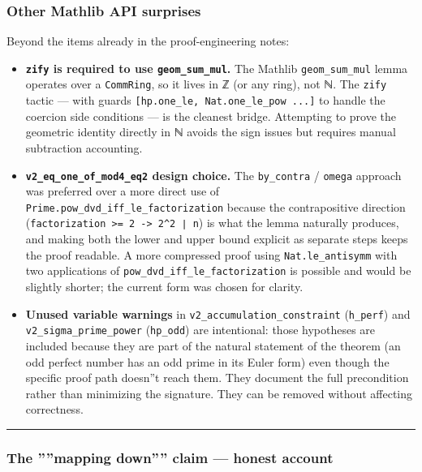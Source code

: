 \documentclass[10pt,a4paper]{article}
\begin{document}
\subsubsection{Other Mathlib API surprises}

Beyond the items already in the proof-engineering notes:

\begin{itemize}
    \item \textbf{\texttt{zify} is required to use \texttt{geom\_sum\_mul}.} The Mathlib \texttt{geom\_sum\_mul} lemma operates
over a \texttt{CommRing}, so it lives in ℤ (or any ring), not ℕ. The \texttt{zify} tactic --- with guards
\texttt{{[}hp.one\_le, Nat.one\_le\_pow ...{]}} to handle the coercion side conditions --- is the cleanest
bridge. Attempting to prove the geometric identity directly in ℕ avoids the sign issues but
requires manual subtraction accounting.
    \item \textbf{\texttt{v2\_eq\_one\_of\_mod4\_eq2} design choice.} The \texttt{by\_contra} / \texttt{omega} approach was preferred
over a more direct use of \texttt{Prime.pow\_dvd\_iff\_le\_factorization} because the contrapositive
direction (\texttt{factorization \textgreater{}= 2 -\textgreater{} 2\^{}2 ∣ n}) is what the lemma naturally produces, and making
both the lower and upper bound explicit as separate steps keeps the proof readable. A more
compressed proof using \texttt{Nat.le\_antisymm} with two applications of
\texttt{pow\_dvd\_iff\_le\_factorization} is possible and would be slightly shorter; the current form
was chosen for clarity.
    \item \textbf{Unused variable warnings} in \texttt{v2\_accumulation\_constraint} (\texttt{h\_perf}) and
\texttt{v2\_sigma\_prime\_power} (\texttt{hp\_odd}) are intentional: those hypotheses are included because
they are part of the natural statement of the theorem (an odd perfect number has an odd prime
in its Euler form) even though the specific proof path doesn''t reach them. They document
the full precondition rather than minimizing the signature. They can be removed without
affecting correctness.
\end{itemize}

\begin{center}
\rule{0.5\textwidth}{0.4pt}
\end{center}

\subsubsection{The ''''mapping down'''' claim --- honest account}
\end{document}
